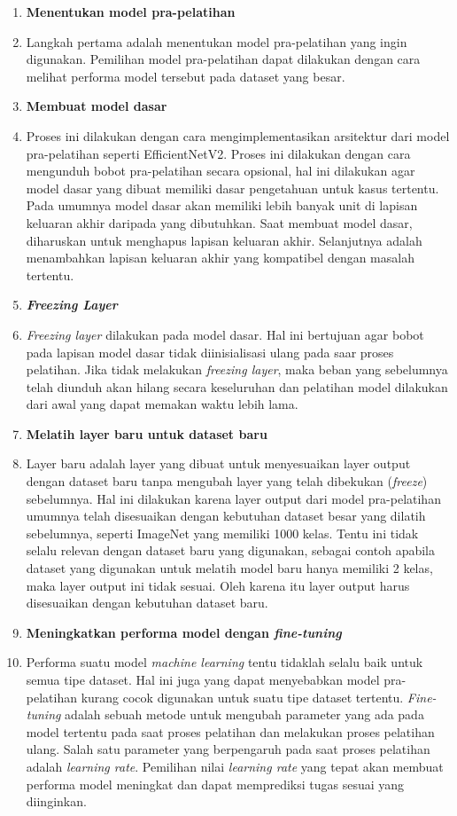 \begin{enumerate}
    \item \textbf{Menentukan model pra-pelatihan}
    \item[] Langkah pertama adalah menentukan model pra-pelatihan yang ingin digunakan. Pemilihan model pra-pelatihan dapat dilakukan dengan cara melihat performa model tersebut pada dataset yang besar.
    \item \textbf{Membuat model dasar}
    \item [] Proses ini dilakukan dengan cara mengimplementasikan arsitektur dari model pra-pelatihan seperti EfficientNetV2. Proses ini dilakukan dengan cara mengunduh bobot pra-pelatihan secara opsional, hal ini dilakukan agar model dasar yang dibuat memiliki dasar pengetahuan untuk kasus tertentu. Pada umumnya model dasar akan memiliki lebih banyak unit di lapisan keluaran akhir daripada yang dibutuhkan. Saat membuat model dasar, diharuskan untuk menghapus lapisan keluaran akhir. Selanjutnya adalah menambahkan lapisan keluaran akhir yang kompatibel dengan masalah tertentu.
    \item \textbf{\textit{Freezing Layer}}
    \item[] \textit{Freezing layer} dilakukan pada model dasar. Hal ini bertujuan agar bobot pada lapisan model dasar tidak diinisialisasi ulang pada saar proses pelatihan. Jika tidak melakukan \textit{freezing layer}, maka beban yang sebelumnya telah diunduh akan hilang secara keseluruhan dan pelatihan model dilakukan dari awal yang dapat memakan waktu lebih lama.
    \item \textbf{Melatih layer baru untuk dataset baru}
    \item[] Layer baru adalah layer yang dibuat untuk menyesuaikan layer output dengan dataset baru tanpa mengubah layer yang telah dibekukan (\textit{freeze}) sebelumnya. Hal ini dilakukan karena layer output dari model pra-pelatihan umumnya telah disesuaikan dengan kebutuhan dataset besar yang dilatih sebelumnya, seperti ImageNet yang memiliki 1000 kelas. Tentu ini tidak selalu relevan dengan dataset baru yang digunakan, sebagai contoh apabila dataset yang digunakan untuk melatih model baru hanya memiliki 2 kelas, maka layer output ini tidak sesuai. Oleh karena itu layer output harus disesuaikan dengan kebutuhan dataset baru.
    \item \textbf{Meningkatkan performa model dengan \textit{fine-tuning}}
    \item[] Performa suatu model \textit{machine learning} tentu tidaklah selalu baik untuk semua tipe dataset. Hal ini juga yang dapat menyebabkan model pra-pelatihan kurang cocok digunakan untuk suatu tipe dataset tertentu. \textit{Fine-tuning} adalah sebuah metode untuk mengubah parameter yang ada pada model tertentu pada saat proses pelatihan dan melakukan proses pelatihan ulang. Salah satu parameter yang berpengaruh pada saat proses pelatihan adalah \textit{learning rate}. Pemilihan nilai \textit{learning rate} yang tepat akan membuat performa model meningkat dan dapat memprediksi tugas sesuai yang diinginkan.
\end{enumerate}


